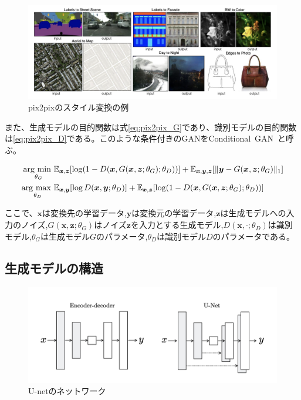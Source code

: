 \begin{figure}[t]
\begin{center}
\includegraphics[width=\hsize]{figure/pix2pix_img.png}
\caption{pix2pixのスタイル変換の例}
\label{fig:pix2pix_img}
\end{center}
\end{figure}

また、生成モデルの目的関数は式\ref{eq:pix2pix_G}であり、識別モデルの目的関数は\ref{eq:pix2pix_D}である。このような条件付きのGANをConditional~GAN~\cite{CGAN}と呼ぶ。

\begin{align}
    \label{eq:pix2pix_G}
    \mathop{\rm arg~min~}\limits _{\theta_G}& \mathbb{E}_{\boldsymbol{x}, \boldsymbol{z}}[\log (1-D(\boldsymbol{x}, G(\boldsymbol{x}, \boldsymbol{z}; \theta_G); \theta_D))]+\mathbb{E}_{\boldsymbol{x}, \boldsymbol{y}, \boldsymbol{z}}[\|\boldsymbol{y}-G(\boldsymbol{x}, \boldsymbol{z}; \theta_G)\|_{1}]\\
    \label{eq:pix2pix_D}
    \mathop{\rm arg~max~}\limits _{\theta_D}& \mathbb{E}_{\boldsymbol{x}, \boldsymbol{y}}[\log D(\boldsymbol{x}, \boldsymbol{y}; \theta_D)]+\mathbb{E}_{\boldsymbol{x}, \boldsymbol{z}}[\log (1-D(\boldsymbol{x}, G(\boldsymbol{x}, \boldsymbol{z}; \theta_G); \theta_D))]
\end{align}


ここで、$\boldsymbol{x}$は変換先の学習データ,$\boldsymbol{y}$は変換元の学習データ,$\boldsymbol{z}$は生成モデルへの入力のノイズ,$G(\boldsymbol{x},\boldsymbol{z};\theta_G)$はノイズ$\boldsymbol{z}$を入力とする生成モデル,$D(\boldsymbol{x},\cdot;\theta_D)$は識別モデル,$\theta_G$は生成モデル$G$のパラメータ,$\theta_D$は識別モデル$D$のパラメータである。

\subsection{生成モデルの構造}

\begin{figure}[H]
\begin{center}
\includegraphics[width=\hsize]{figure/u-net.png}
\caption{U-netのネットワーク}
\label{fig:u-net}
\end{center}
\end{figure}

